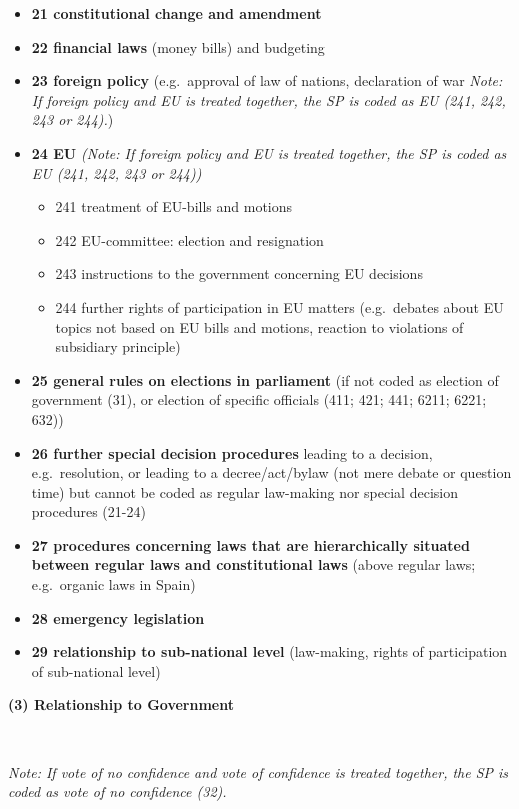 \documentclass[10pt,]{article}
\providecommand{\tightlist}{%
  \setlength{\itemsep}{0pt}\setlength{\parskip}{0pt}}
\begin{document}
\begin{itemize}
\tightlist
\item
  \textbf{21 constitutional change and amendment}
\item
  \textbf{22 financial laws} (money bills) and budgeting
\item
  \textbf{23 foreign policy} (e.g.~approval of law of nations,
  declaration of war \emph{Note: If foreign policy and EU is treated
  together, the SP is coded as EU (241, 242, 243 or 244).})
\item
  \textbf{24 EU} \emph{(Note: If foreign policy and EU is treated
  together, the SP is coded as EU (241, 242, 243 or 244))}

  \begin{itemize}
  \tightlist
  \item
    241 treatment of EU-bills and motions
  \item
    242 EU-committee: election and resignation
  \item
    243 instructions to the government concerning EU decisions
  \item
    244 further rights of participation in EU matters (e.g.~debates
    about EU topics not based on EU bills and motions, reaction to
    violations of subsidiary principle)
  \end{itemize}
\item
  \textbf{25 general rules on elections in parliament} (if not coded as
  election of government (31), or election of specific officials (411;
  421; 441; 6211; 6221; 632))
\item
  \textbf{26 further special decision procedures} leading to a decision,
  e.g.~resolution, or leading to a decree/act/bylaw (not mere debate or
  question time) but cannot be coded as regular law-making nor special
  decision procedures (21-24)
\item
  \textbf{27 procedures concerning laws that are hierarchically situated
  between regular laws and constitutional laws} (above regular laws;
  e.g.~organic laws in Spain)
\item
  \textbf{28 emergency legislation}
\item
  \textbf{29 relationship to sub-national level} (law-making, rights of
  participation of sub-national level)
\end{itemize}

\textbf{(3) Relationship to Government}

~

\emph{Note: If vote of no confidence and vote of confidence is treated
together, the SP is coded as vote of no confidence (32).}
\end{document}
